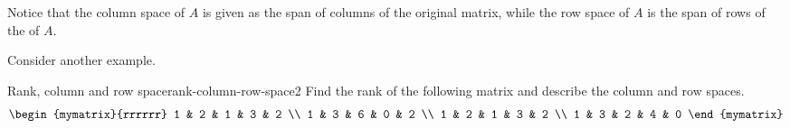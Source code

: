 Notice that the column space of $A$ is given as the span of columns of
the original matrix, while the row space of $A$ is the span of rows of
the {\rref} of $A$.

Consider another example.

\begin{example}{Rank, column and row space}{rank-column-row-space2}
  Find the rank of the following matrix and describe the
  column and row spaces.
  \begin{equation*}
    \begin{mymatrix}{rrrrrr}
      1 & 2 & 1 & 3 & 2 \\
      1 & 3 & 6 & 0 & 2 \\
      1 & 2 & 1 & 3 & 2 \\
      1 & 3 & 2 & 4 & 0
    \end{mymatrix}
  \end{equation*}
\end{example}

